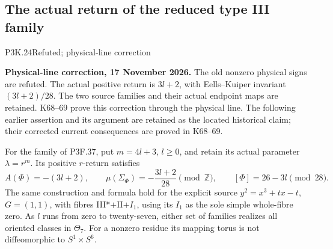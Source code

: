 \subsection{The actual return of the reduced type III family}

\begin{statement}{P3K.24}{Refuted; physical-line correction}\par\noindent\textbf{Physical-line correction, 17 November 2026.} The old nonzero physical signs are refuted. The actual positive return is \(3l+2\), with Eells--Kuiper invariant \((3l+2)/28\). The two source families and their actual endpoint maps are retained. K68--69 prove this correction through the physical line. The following earlier assertion and its argument are retained as the located historical claim; their corrected current consequences are proved in K68--69.\medskip\par 
For the family of P3F.37, put $m=4l+3$, $l\ge0$, and retain
its actual parameter $\lambda=r^m$. Its positive $r$-return
satisfies
\[
 A(\Phi)=-(3l+2),\qquad
 \mu(\Sigma_\Phi)=-\frac{3l+2}{28}\pmod{\mathbb Z},
 \qquad [\Phi]=26-3l\pmod{28}.                         \tag{K24.1}
\]
The same construction and formula hold for the explicit source
$y^2=x^3+tx-t$, $G=(1,1)$, with fibres III*$+$II$+I_1$,
using its $I_1$ as the sole simple whole-fibre zero. As $l$ runs
from zero to twenty-seven, either set of families realizes all
oriented classes in $\Theta_7$. For a nonzero residue its mapping
torus is not diffeomorphic to $S^1\times S^6$.
\end{statement}
